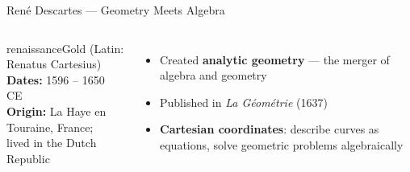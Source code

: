 \begin{frame}{Ren\'{e} Descartes --- Geometry Meets Algebra}
  \begin{columns}[T]
    \begin{personbox}{renaissanceGold}
      {\small (Latin: Renatus Cartesius)}\\[3pt]
      \textbf{Dates:} 1596 -- 1650 CE\\
      \textbf{Origin:} La Haye en Touraine, France;\\lived in the Dutch Republic
    \end{personbox}
    \vspace{0.3em}
    \begin{itemize}
      \item Created \textbf{analytic geometry} --- the merger of algebra and geometry
      \item Published in \textit{La G\'{e}om\'{e}trie} (1637)
      \item \textbf{Cartesian coordinates}: describe curves as equations, solve geometric problems algebraically
    \end{itemize}

  \end{columns}

\end{frame}

